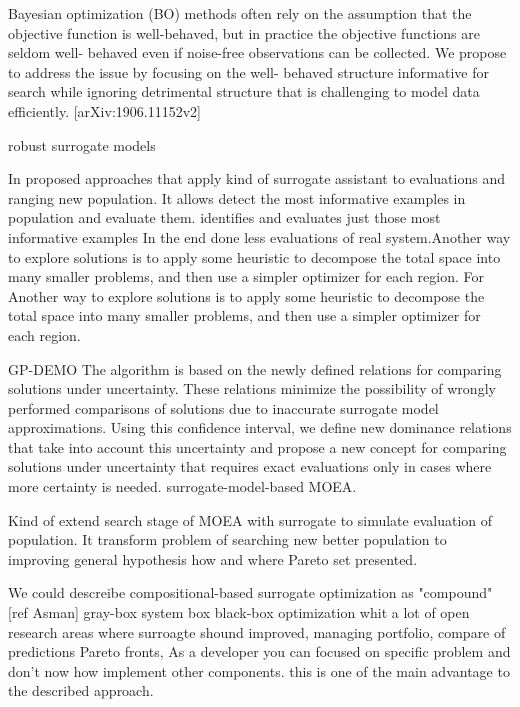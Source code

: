         Bayesian optimization (BO) methods often rely on the assumption that the objective function 
        is well-behaved, but in practice the objective functions are seldom well- behaved even if 
        noise-free observations can be collected. We propose to address the issue by focusing on 
        the well- behaved structure informative for search while ignoring detrimental structure 
        that is challenging to model data efficiently. [arXiv:1906.11152v2]

        robust surrogate models

        In \cite{KrallMD15} proposed approaches that apply kind of surrogate assistant to evaluations and ranging new 
        population. It allows detect the most informative examples in population and evaluate them. 
        identifies and evaluates just those most informative examples
        In the end done less evaluations of real system.Another way to explore solutions is to apply some heuristic to decompose the total space into many smaller problems, and then use a simpler optimizer for each region. For
        Another way to explore solutions is to apply some heuristic to 
        decompose the total space into many smaller problems, and then use a simpler optimizer for each region. 
        
        GP-DEMO \cite{MlakarPTF15} The algorithm is based on the newly defined relations for comparing solutions under uncertainty. 
        These relations minimize the possibility of wrongly performed comparisons of solutions due to inaccurate 
        surrogate model approximations. Using this confidence interval, we define new dominance relations that take into account 
        this uncertainty and propose a new concept for comparing solutions under uncertainty that requires exact evaluations 
        only in cases where more certainty is needed.
        surrogate-model-based MOEA.

        Kind of extend search stage of MOEA with surrogate to simulate evaluation of population. It transform
        problem of searching new better population to improving general hypothesis how and where Pareto set presented.  
        
        We could descreibe compositional-based surrogate optimization as "compound"[ref Asman] gray-box system box black-box optimization
        whit a lot of open research areas where surroagte shound improved, managing portfolio, compare of predictions Pareto fronts,
        As a developer you can focused on specific problem and don't now how implement other components. 
        this is one of the main advantage to the described approach.

